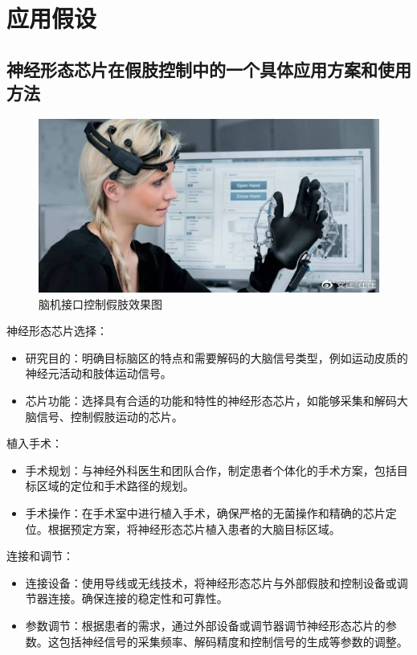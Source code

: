 \documentclass{thuemp}
\begin{document}
\section{应用假设}
\subsection{神经形态芯片在假肢控制中的一个具体应用方案和使用方法}

\begin{figure}[h]
	\centering
    \includegraphics[width=0.8\linewidth]{./img/njjk-jzh.jpeg}
    \caption{脑机接口控制假肢效果图}
\end{figure}

{\heiti 神经形态芯片选择：}
\begin{itemize}
	\item 研究目的：明确目标脑区的特点和需要解码的大脑信号类型，例如运动皮质的神经元活动和肢体运动信号。
	\item 芯片功能：选择具有合适的功能和特性的神经形态芯片，如能够采集和解码大脑信号、控制假肢运动的芯片。
\end{itemize}

{\heiti 植入手术：}
\begin{itemize}
	\item 手术规划：与神经外科医生和团队合作，制定患者个体化的手术方案，包括目标区域的定位和手术路径的规划。
	\item 手术操作：在手术室中进行植入手术，确保严格的无菌操作和精确的芯片定位。根据预定方案，将神经形态芯片植入患者的大脑目标区域。
\end{itemize}

{\heiti 连接和调节：}
\begin{itemize}
	\item 连接设备：使用导线或无线技术，将神经形态芯片与外部假肢和控制设备或调节器连接。确保连接的稳定性和可靠性。
	\item 参数调节：根据患者的需求，通过外部设备或调节器调节神经形态芯片的参数。这包括神经信号的采集频率、解码精度和控制信号的生成等参数的调整。
\end{itemize}
\end{document}
